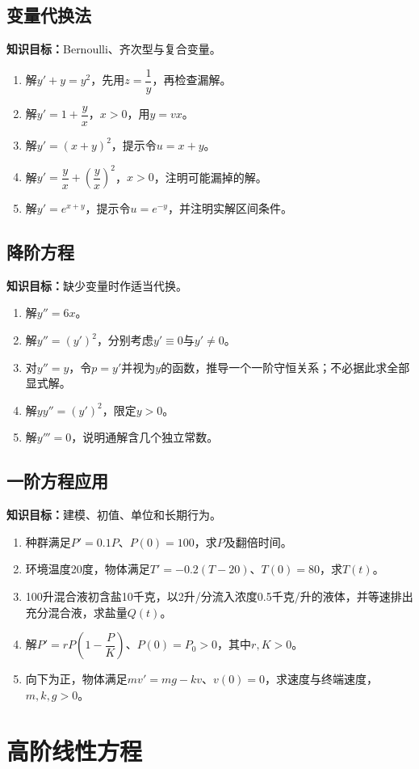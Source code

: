 \documentclass[11pt,a4paper,fontset=fandol]{ctexrep}
\newcommand{\goal}[1]{\textbf{知识目标：}#1\par}
\begin{document}
\subsection{变量代换法}
\goal{Bernoulli、齐次型与复合变量。}
\begin{enumerate}
\item 解$y'+y=y^2$，先用$z=\dfrac{1}{y}$，再检查漏解。
\item 解$y'=1+\dfrac{y}{x}$，$x>0$，用$y=vx$。
\item 解$y'=(x+y)^2$，提示令$u=x+y$。
\item 解$y'=\dfrac{y}{x}+\left(\dfrac{y}{x}\right)^2$，$x>0$，注明可能漏掉的解。
\item 解$y'=e^{x+y}$，提示令$u=e^{-y}$，并注明实解区间条件。
\end{enumerate}
\subsection{降阶方程}
\goal{缺少变量时作适当代换。}
\begin{enumerate}
\item 解$y''=6x$。
\item 解$y''=(y')^2$，分别考虑$y'\equiv0$与$y'\ne0$。
\item 对$y''=y$，令$p=y'$并视为$y$的函数，推导一个一阶守恒关系；不必据此求全部显式解。
\item 解$yy''=(y')^2$，限定$y>0$。
\item 解$y'''=0$，说明通解含几个独立常数。
\end{enumerate}
\subsection{一阶方程应用}
\goal{建模、初值、单位和长期行为。}
\begin{enumerate}
\item 种群满足$P'=0.1P$、$P(0)=100$，求$P$及翻倍时间。
\item 环境温度20度，物体满足$T'=-0.2(T-20)$、$T(0)=80$，求$T(t)$。
\item 100升混合液初含盐10千克，以2升/分流入浓度0.5千克/升的液体，并等速排出充分混合液，求盐量$Q(t)$。
\item 解$P'=rP\left(1-\dfrac{P}{K}\right)$、$P(0)=P_0>0$，其中$r,K>0$。
\item 向下为正，物体满足$mv'=mg-kv$、$v(0)=0$，求速度与终端速度，$m,k,g>0$。
\end{enumerate}
\section{高阶线性方程}
\end{document}
